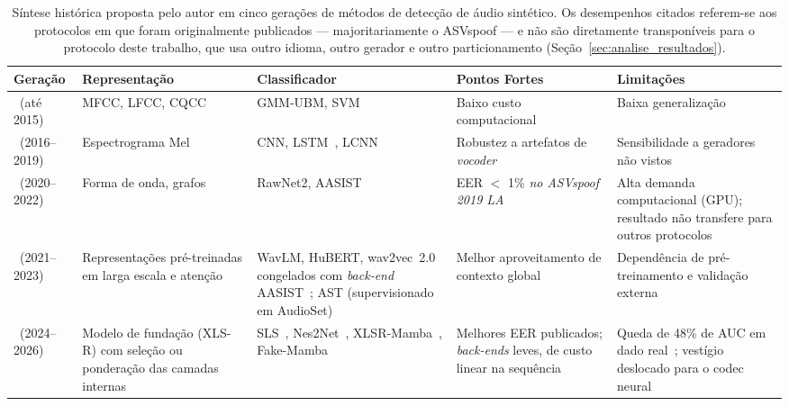 \documentclass[12pt,a4paper]{article}
\begin{document}
\begin{table}[H]
	\centering
	\caption[\textit{Survey} das gerações de métodos de detecção de áudio sintético.]{Síntese histórica proposta pelo autor em cinco gerações de métodos de detecção
		de áudio sintético. Os desempenhos citados referem-se aos protocolos em que foram
		originalmente publicados --- majoritariamente o ASVspoof --- e não são
		diretamente transponíveis para o protocolo deste trabalho, que usa outro
		idioma, outro gerador e outro particionamento
		(Seção~\ref{sec:analise_resultados}).}
	\label{tab:survey_geracoes}
	\footnotesize\singlespacing
	\setlength{\tabcolsep}{3pt}
	\begin{tabular}{@{}>{\raggedright\arraybackslash}p{1.9cm}
			>{\raggedright\arraybackslash}p{2.8cm}
			>{\raggedright\arraybackslash}p{2.9cm}
			>{\raggedright\arraybackslash}p{3.1cm}
			>{\raggedright\arraybackslash}p{2.7cm}@{}}
		\toprule
		\textbf{Geração} & \textbf{Representação} & \textbf{Classificador} & \textbf{Pontos Fortes} & \textbf{Limitações} \\
		\midrule
		1\textordfeminine\ (até 2015) & MFCC, LFCC, CQCC & GMM-UBM, SVM~\cite{cortes1995support} & Baixo custo computacional & Baixa generalização \\
		\addlinespace
		2\textordfeminine\ (2016--2019) & Espectrograma Mel & CNN, LSTM~\cite{hochreiter1997lstm}, LCNN & Robustez a artefatos de \textit{vocoder} & Sensibilidade a geradores não vistos \\
		\addlinespace
		3\textordfeminine\ (2020--2022) & Forma de onda, grafos & RawNet2, AASIST & EER $<$ 1\% \emph{no ASVspoof 2019 LA} & Alta demanda computacional (GPU); resultado não transfere para outros protocolos \\
		\addlinespace
		4\textordfeminine\ (2021--2023) & Representações pré-treinadas em larga escala e atenção & WavLM, HuBERT, wav2vec~2.0 congelados com \textit{back-end} AASIST~\cite{tak2022wav2vec}; AST (supervisionado em AudioSet) & Melhor aproveitamento de contexto global & Dependência de pré-treinamento e validação externa \\
		\addlinespace
		5\textordfeminine\ (2024--2026) & Modelo de fundação (XLS-R) com seleção ou ponderação das camadas internas & SLS~\cite{zhang2024sls}, Nes2Net~\cite{liu2025nes2net}, XLSR-Mamba~\cite{xiao2025xlsrmamba}, Fake-Mamba~\cite{xuan2025fakemamba} & Melhores EER publicados; \textit{back-ends} leves, de custo linear na sequência & Queda de \num{48}\% de AUC em dado real~\cite{chandra2025deepfakeeval}; vestígio deslocado para o codec neural~\cite{xie2024codecfake} \\
		\bottomrule
	\end{tabular}
\end{table}
\end{document}
